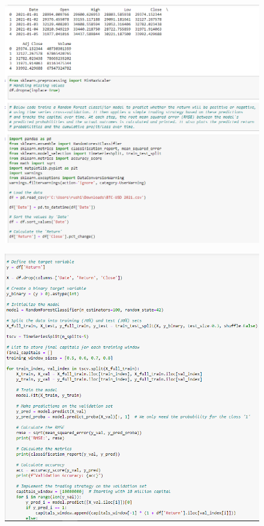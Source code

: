 \begin{figure}[H]
\centering
\includegraphics[scale=0.65]{fig17.jpg}
\end{figure}

\begin{figure}[H]
\centering
\includegraphics[scale=0.75]{fig18.jpg}

\end{figure}

